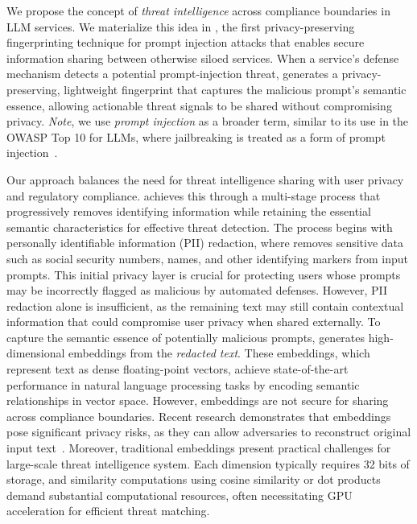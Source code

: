  We propose the concept of \emph{threat intelligence} across compliance boundaries in LLM services. 
We materialize this idea in \tool, the first privacy-preserving fingerprinting technique for prompt injection attacks that enables secure information sharing between otherwise siloed services. 
When a service's defense mechanism detects a potential prompt-injection threat, \tool generates a privacy-preserving, lightweight fingerprint that captures the malicious prompt's semantic essence, allowing actionable threat signals to be shared without compromising privacy. \emph{Note}, we use \emph{prompt injection} as a broader term, similar to its use in the OWASP Top 10 for LLMs, where jailbreaking is treated as a form of prompt injection~\cite{LLM012025PromptInjection}.
%

Our approach balances the need for threat intelligence sharing with user privacy and regulatory compliance. \tool achieves this through a multi-stage process that progressively removes identifying information while retaining the essential semantic characteristics for effective threat detection.
%
The process begins with personally identifiable information (PII) redaction, where \tool removes sensitive data such as social security numbers, names, and other identifying markers from input prompts. This initial privacy layer is crucial for protecting users whose prompts may be incorrectly flagged as malicious by automated defenses. However, PII redaction alone is insufficient, as the remaining text may still contain contextual information that could compromise user privacy when shared externally.
% 
To capture the semantic essence of potentially malicious prompts, \tool generates high-dimensional embeddings from the \emph{redacted text}. 
These embeddings, which represent text as dense floating-point vectors, achieve state-of-the-art performance in natural language processing tasks by encoding semantic relationships in vector space.
%
However, embeddings are not secure for sharing across compliance boundaries. 
Recent research demonstrates that embeddings pose significant privacy risks, as they can allow adversaries to reconstruct original input text~\cite{forbesSystemsVector, li2023sentence, tragoudaras2025information, owasp2025vectorEmbedding}. 
Moreover, traditional embeddings present practical challenges for large-scale threat intelligence system. 
Each dimension typically requires 32 bits of storage, and similarity computations using cosine similarity or dot products demand substantial computational resources, often necessitating GPU acceleration for efficient threat matching.
%

